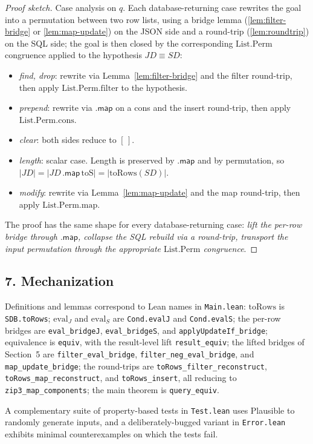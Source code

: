 \documentclass{article}
\begin{document}
\begin{proof}[Proof sketch]
Case analysis on $q$. Each database-returning case rewrites the goal into a permutation between two row lists, using a bridge lemma (\ref{lem:filter-bridge} or \ref{lem:map-update}) on the JSON side and a round-trip (\ref{lem:roundtrip}) on the SQL side; the goal is then closed by the corresponding $\mathrm{List.Perm}$ congruence applied to the hypothesis $JD \equiv SD$:
\begin{itemize}
    \item \emph{\textsf{find}, \textsf{drop}}: rewrite via Lemma~\ref{lem:filter-bridge} and the filter round-trip, then apply $\mathrm{List.Perm.filter}$ to the hypothesis.
    \item \emph{\textsf{prepend}}: rewrite via $\textsf{.map}$ on a cons and the insert round-trip, then apply $\mathrm{List.Perm.cons}$.
    \item \emph{\textsf{clear}}: both sides reduce to $[\,]$.
    \item \emph{\textsf{length}}: scalar case. Length is preserved by $\textsf{.map}$ and by permutation, so $|JD| = |JD\,\textsf{.map}\,\mathrm{toS}| = |\mathrm{toRows}(SD)|$.
    \item \emph{\textsf{modify}}: rewrite via Lemma~\ref{lem:map-update} and the map round-trip, then apply $\mathrm{List.Perm.map}$.
\end{itemize}
The proof has the same shape for every database-returning case: \emph{lift the per-row bridge through $\textsf{.map}$, collapse the SQL rebuild via a round-trip, transport the input permutation through the appropriate $\mathrm{List.Perm}$ congruence}.
\end{proof}

\subsection*{7. Mechanization}

Definitions and lemmas correspond to Lean names in \texttt{Main.lean}: $\mathrm{toRows}$ is \texttt{SDB.toRows}; $\mathrm{eval}_J$ and $\mathrm{eval}_S$ are \texttt{Cond.evalJ} and \texttt{Cond.evalS}; the per-row bridges are \texttt{eval\_bridgeJ}, \texttt{eval\_bridgeS}, and \texttt{applyUpdateIf\_bridge}; equivalence is \texttt{equiv}, with the result-level lift \texttt{result\_equiv}; the lifted bridges of Section~5 are \texttt{filter\_eval\_bridge}, \texttt{filter\_neg\_eval\_bridge}, and \texttt{map\_update\_bridge}; the round-trips are \texttt{toRows\_filter\_reconstruct}, \texttt{toRows\_map\_reconstruct}, and \texttt{toRows\_insert}, all reducing to \texttt{zip3\_map\_components}; the main theorem is \texttt{query\_equiv}.

A complementary suite of property-based tests in \texttt{Test.lean} uses Plausible to randomly generate inputs, and a deliberately-bugged variant in \texttt{Error.lean} exhibits minimal counterexamples on which the tests fail.
\end{document}
